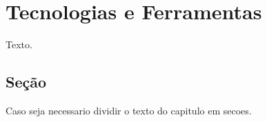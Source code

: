 \chapter{Tecnologias e Ferramentas} \label{chapter:ferramentas}

Texto.

\section{Seção} \label{section:sec1}

Caso seja necessario dividir o texto do capitulo em secoes.